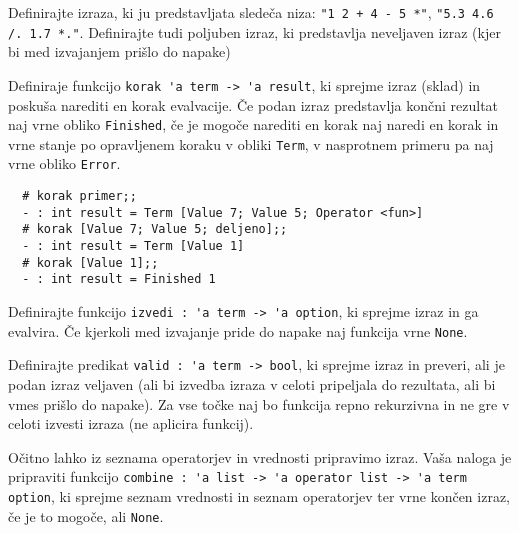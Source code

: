 \documentclass[arhiv]{../izpit}
\begin{document}
\podnaloga Definirajte izraza, ki ju predstavljata sledeča niza: \verb|"1 2 + 4 - 5 *"|, \verb|"5.3 4.6 /. 1.7 *."|. 
   Definirajte tudi poljuben izraz, ki predstavlja neveljaven izraz (kjer bi med izvajanjem prišlo do napake)


\podnaloga
Definiraje funkcijo \verb|korak 'a term -> 'a result|, ki sprejme izraz (sklad) in poskuša narediti en korak evalvacije.
Če podan izraz predstavlja končni rezultat naj vrne obliko \verb|Finished|, 
če je mogoče narediti en korak naj naredi en korak in vrne stanje po opravljenem koraku v obliki \verb|Term|, 
v nasprotnem primeru pa naj vrne obliko \verb|Error|.

\begin{verbatim}
  # korak primer;;
  - : int result = Term [Value 7; Value 5; Operator <fun>]
  # korak [Value 7; Value 5; deljeno];;
  - : int result = Term [Value 1]
  # korak [Value 1];;
  - : int result = Finished 1
\end{verbatim}


\podnaloga
Definirajte funkcijo \verb|izvedi : 'a term -> 'a option|, ki sprejme izraz in ga evalvira. 
Če kjerkoli med izvajanje pride do napake naj funkcija vrne \verb|None|.


\podnaloga
Definirajte predikat \verb|valid : 'a term -> bool|, ki sprejme izraz in preveri, 
ali je podan izraz veljaven (ali bi izvedba izraza v celoti pripeljala do rezultata, 
ali bi vmes prišlo do napake). 
Za vse točke naj bo funkcija repno rekurzivna in ne gre v celoti izvesti izraza (ne aplicira funkcij).


\podnaloga
Očitno lahko iz seznama operatorjev in vrednosti pripravimo izraz. 
Vaša naloga je pripraviti funkcijo \verb|combine : 'a list -> 'a operator list -> 'a term option|, 
ki sprejme seznam vrednosti in seznam operatorjev ter vrne končen izraz, če je to mogoče, ali \verb|None|.
\end{document}

